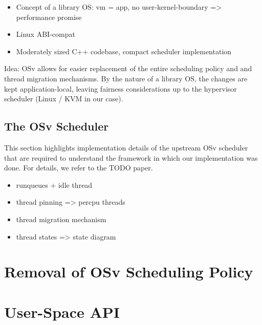 \documentclass[12pt,a4paper]{book}
\begin{document}
\begin{itemize}
    \item Concept of a library OS: vm = app, no user-kernel-boundary => performance promise
    \item Linux ABI-compat
    \item Moderately sized C++ codebase, compact scheduler implementation
\end{itemize}
Idea: OSv allows for easier replacement of the entire scheduling policy and and thread migration mechanisms.
By the nature of a library OS, the changes are kept application-local, leaving fairness considerations up to the hypervisor scheduler (Linux / KVM in our case).

\subsection{The OSv Scheduler}
This section highlights implementation details of the upstream OSv scheduler that are required to understand the framework in which our implementation was done.
For details, we refer to the TODO paper.
\begin{itemize}
    \item runqueues + idle thread
    \item thread pinning => percpu threads
    \item thread migration mechanism
    \item thread states => state diagram
\end{itemize}

\section{Removal of OSv Scheduling Policy}\label{ch:di:rmsched}
%   
\blindtext
\section{User-Space API}\label{ch:di:api}
\blindtext
\end{document}

